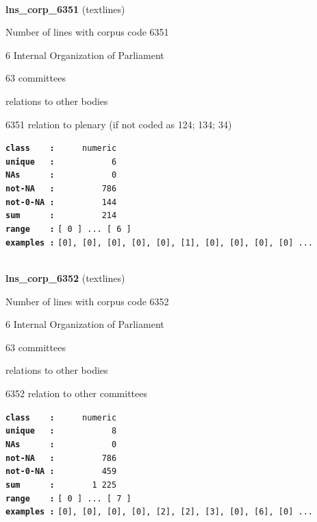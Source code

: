 \documentclass[]{article}
\begin{document}
~

\textbf{lns\_corp\_6351} (textlines)

Number of lines with corpus code 6351

6 Internal Organization of Parliament

63 committees

relations to other bodies

6351 relation to plenary (if not coded as 124; 134; 34)

\textbf{\texttt{class\ \ \ \ :}} \texttt{~~~~~numeric}\\
\textbf{\texttt{unique\ \ \ :}} \texttt{~~~~~~~~~~~6}\\
\textbf{\texttt{NAs\ \ \ \ \ \ :}} \texttt{~~~~~~~~~~~0}\\
\textbf{\texttt{not-NA\ \ \ :}} \texttt{~~~~~~~~~786}\\
\textbf{\texttt{not-0-NA\ :}} \texttt{~~~~~~~~~144}\\
\textbf{\texttt{sum\ \ \ \ \ \ :}} \texttt{~~~~~~~~~214}\\
\textbf{\texttt{range\ \ \ \ :}}
\texttt{{[}\ 0\ {]}\ ...\ {[}\ 6\ {]}}\\
\textbf{\texttt{examples\ :}}
\texttt{{[}0{]},\ {[}0{]},\ {[}0{]},\ {[}0{]},\ {[}0{]},\ {[}1{]},\ {[}0{]},\ {[}0{]},\ {[}0{]},\ {[}0{]}\ ...}\\

~

\textbf{lns\_corp\_6352} (textlines)

Number of lines with corpus code 6352

6 Internal Organization of Parliament

63 committees

relations to other bodies

6352 relation to other committees

\textbf{\texttt{class\ \ \ \ :}} \texttt{~~~~~numeric}\\
\textbf{\texttt{unique\ \ \ :}} \texttt{~~~~~~~~~~~8}\\
\textbf{\texttt{NAs\ \ \ \ \ \ :}} \texttt{~~~~~~~~~~~0}\\
\textbf{\texttt{not-NA\ \ \ :}} \texttt{~~~~~~~~~786}\\
\textbf{\texttt{not-0-NA\ :}} \texttt{~~~~~~~~~459}\\
\textbf{\texttt{sum\ \ \ \ \ \ :}} \texttt{~~~~~~~1~225}\\
\textbf{\texttt{range\ \ \ \ :}}
\texttt{{[}\ 0\ {]}\ ...\ {[}\ 7\ {]}}\\
\textbf{\texttt{examples\ :}}
\texttt{{[}0{]},\ {[}0{]},\ {[}0{]},\ {[}0{]},\ {[}2{]},\ {[}2{]},\ {[}3{]},\ {[}0{]},\ {[}6{]},\ {[}0{]}\ ...}\\
\end{document}
